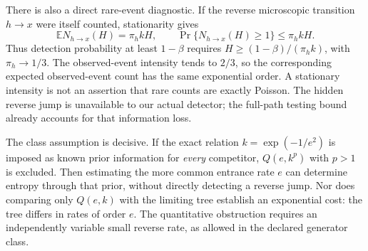 There is also a direct rare-event diagnostic. If the reverse microscopic transition $h\to x$ were itself counted, stationarity gives
\begin{equation}
 \mathbb E N_{h\to x}(H)=\pi_h kH,\qquad
 \Pr\{N_{h\to x}(H)\ge1\}\le\pi_h kH.
\end{equation}
Thus detection probability at least $1-\beta$ requires $H\ge(1-\beta)/(\pi_h k)$, with $\pi_h\to1/3$. The observed-event intensity tends to $2/3$, so the corresponding expected observed-event count has the same exponential order. A stationary intensity is not an assertion that rare counts are exactly Poisson. The hidden reverse jump is unavailable to our actual detector; the full-path testing bound already accounts for that information loss.

The class assumption is decisive. If the exact relation $k=\exp(-1/e^2)$ is imposed as known prior information for \emph{every} competitor, $Q(e,k^p)$ with $p>1$ is excluded. Then estimating the more common entrance rate $e$ can determine entropy through that prior, without directly detecting a reverse jump. Nor does comparing only $Q(e,k)$ with the limiting tree establish an exponential cost: the tree differs in rates of order $e$. The quantitative obstruction requires an independently variable small reverse rate, as allowed in the declared generator class.
